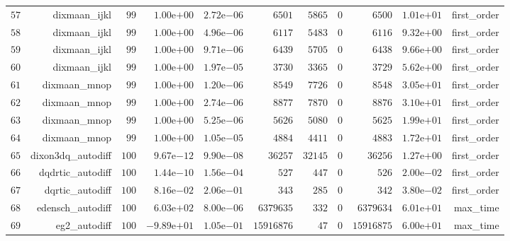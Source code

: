 \documentclass[varwidth=20cm,crop=true]{standalone}
\begin{document}
\begin{longtable}{rrrrrrrrrrr}
  \(    57\) & dixmaan\_ijkl & \(    99\) & \( 1.00\)e\(+00\) & \( 2.72\)e\(-06\) & \(  6501\) & \(  5865\) & \(     0\) & \(  6500\) & \( 1.01\)e\(+01\) & first\_order \\
  \(    58\) & dixmaan\_ijkl & \(    99\) & \( 1.00\)e\(+00\) & \( 4.96\)e\(-06\) & \(  6117\) & \(  5483\) & \(     0\) & \(  6116\) & \( 9.32\)e\(+00\) & first\_order \\
  \(    59\) & dixmaan\_ijkl & \(    99\) & \( 1.00\)e\(+00\) & \( 9.71\)e\(-06\) & \(  6439\) & \(  5705\) & \(     0\) & \(  6438\) & \( 9.66\)e\(+00\) & first\_order \\
  \(    60\) & dixmaan\_ijkl & \(    99\) & \( 1.00\)e\(+00\) & \( 1.97\)e\(-05\) & \(  3730\) & \(  3365\) & \(     0\) & \(  3729\) & \( 5.62\)e\(+00\) & first\_order \\
  \(    61\) & dixmaan\_mnop & \(    99\) & \( 1.00\)e\(+00\) & \( 1.20\)e\(-06\) & \(  8549\) & \(  7726\) & \(     0\) & \(  8548\) & \( 3.05\)e\(+01\) & first\_order \\
  \(    62\) & dixmaan\_mnop & \(    99\) & \( 1.00\)e\(+00\) & \( 2.74\)e\(-06\) & \(  8877\) & \(  7870\) & \(     0\) & \(  8876\) & \( 3.10\)e\(+01\) & first\_order \\
  \(    63\) & dixmaan\_mnop & \(    99\) & \( 1.00\)e\(+00\) & \( 5.25\)e\(-06\) & \(  5626\) & \(  5080\) & \(     0\) & \(  5625\) & \( 1.99\)e\(+01\) & first\_order \\
  \(    64\) & dixmaan\_mnop & \(    99\) & \( 1.00\)e\(+00\) & \( 1.05\)e\(-05\) & \(  4884\) & \(  4411\) & \(     0\) & \(  4883\) & \( 1.72\)e\(+01\) & first\_order \\
  \(    65\) & dixon3dq\_autodiff & \(   100\) & \( 9.67\)e\(-12\) & \( 9.90\)e\(-08\) & \( 36257\) & \( 32145\) & \(     0\) & \( 36256\) & \( 1.27\)e\(+00\) & first\_order \\
  \(    66\) & dqdrtic\_autodiff & \(   100\) & \( 1.44\)e\(-10\) & \( 1.56\)e\(-04\) & \(   527\) & \(   447\) & \(     0\) & \(   526\) & \( 2.00\)e\(-02\) & first\_order \\
  \(    67\) & dqrtic\_autodiff & \(   100\) & \( 8.16\)e\(-02\) & \( 2.06\)e\(-01\) & \(   343\) & \(   285\) & \(     0\) & \(   342\) & \( 3.80\)e\(-02\) & first\_order \\
  \(    68\) & edensch\_autodiff & \(   100\) & \( 6.03\)e\(+02\) & \( 8.00\)e\(-06\) & \(6379635\) & \(   332\) & \(     0\) & \(6379634\) & \( 6.01\)e\(+01\) & max\_time \\
  \(    69\) & eg2\_autodiff & \(   100\) & \(-9.89\)e\(+01\) & \( 1.05\)e\(-01\) & \(15916876\) & \(    47\) & \(     0\) & \(15916875\) & \( 6.00\)e\(+01\) & max\_time \\

\end{longtable}
\end{document}
